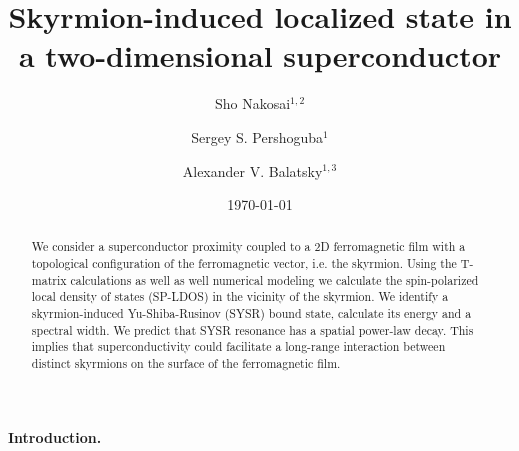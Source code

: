 \documentclass[twocolumn,showpacs,floatfix,nofootinbib,longbibliography]{revtex4-1}
\begin{document}
\title{Skyrmion-induced localized state in a two-dimensional superconductor}

\author{Sho Nakosai$^{1,2}$}
\author{Sergey S. Pershoguba$^{1}$}
\author{Alexander V. Balatsky$^{1,3}$}

\date{\today}


\begin{abstract}
We consider a superconductor proximity coupled to a 2D ferromagnetic film with a topological configuration of the ferromagnetic vector, i.e. the skyrmion. Using the T-matrix calculations as well as well numerical modeling we calculate the spin-polarized local density of states (SP-LDOS) in the vicinity of the skyrmion. We identify a skyrmion-induced Yu-Shiba-Rusinov (SYSR) bound state, calculate its energy and a spectral width. We predict that SYSR resonance has a spatial power-law decay. This implies that superconductivity could facilitate a long-range interaction between distinct skyrmions on the surface of the ferromagnetic film.
\end{abstract}

\pacs{ }   


\maketitle
\paragraph*{Introduction.} \label{sec:intro}
\end{document}
